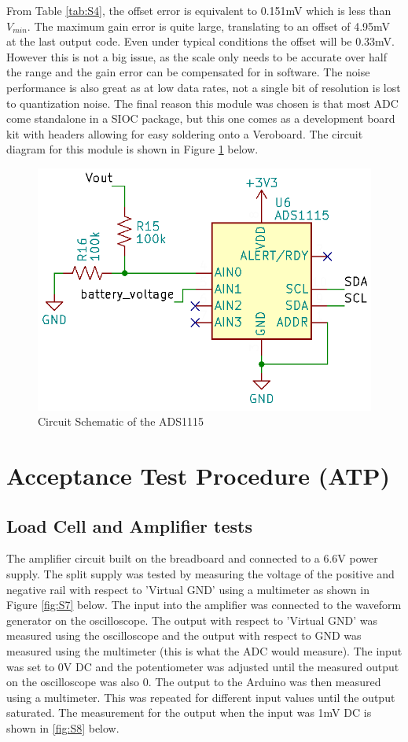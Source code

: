 \documentclass[class=report,11pt,crop=false]{standalone}
\begin{document}
	From Table \ref{tab:S4}, the offset error is equivalent to 0.151mV which is less than $V_{min}$. The maximum gain error is quite large, translating to an offset of 4.95mV at the last output code. Even under typical conditions the offset will be 0.33mV. However this is not a big issue, as the scale only needs to be accurate over half the range and the gain error can be compensated for in software. The noise performance is also great as at low data rates, not a single bit of resolution is lost to quantization noise. The final reason this module was chosen is that most ADC come standalone in a SIOC package, but this one comes as a development board kit with headers allowing for easy soldering onto a Veroboard. The circuit diagram for this module is shown in Figure \ref{fig:S6} below.
	\begin{figure}[h!]
		\centering
		\includegraphics[width=0.5\linewidth]{Figures/ADC.png}
		\caption{Circuit Schematic of the ADS1115}
		\label{fig:S6}
	\end{figure}
	
	\section{Acceptance Test Procedure (ATP)}
	\subsection{Load Cell and Amplifier tests}
	The amplifier circuit built on the breadboard and connected to a 6.6V power supply. The split supply was tested by measuring the voltage of the positive and negative rail with respect to 'Virtual GND' using a multimeter as shown in Figure \ref{fig:S7} below.
	The input into the amplifier was connected to the waveform generator on the oscilloscope. The output with respect to 'Virtual GND' was measured using the oscilloscope and the output with respect to GND was measured using the multimeter (this is what the ADC would measure). The input was set to 0V DC and the potentiometer was adjusted until the measured output on the oscilloscope was also 0. The output to the Arduino was then measured using a multimeter. This was repeated for different input values until the output saturated. The measurement for the output when the input was 1mV DC is shown in \ref{fig:S8} below.
	
\end{document}
